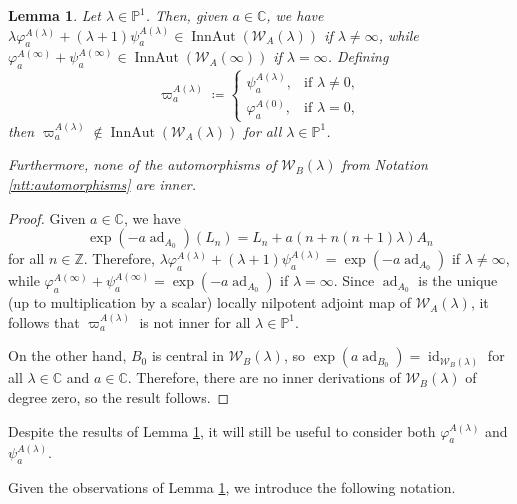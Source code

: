 \documentclass[11pt, svgnames]{amsart}
\DeclareMathOperator{\ad}{ad}
\newcommand{\ZZ}{\mathbb{Z}}
\newcommand{\CC}{\mathbb{C}}
\newcommand{\PP}{\mathbb{P}}
\newcommand{\W}{\mathcal{W}}
\DeclareMathOperator{\id}{id}
\DeclareMathOperator{\InnAut}{InnAut}
\newtheorem{lemma}[proposition]{Lemma}
\theoremstyle{definition}
\begin{document}
\begin{lemma}\label{lem:linear combination is inner}
    Let $\lambda \in \PP^1$. Then, given $a \in \CC$, we have $\lambda \varphi_a^{A(\lambda)} + (\lambda + 1)\psi_a^{A(\lambda)} \in \InnAut(\W_A(\lambda))$ if $\lambda \neq \infty$, while $\varphi_a^{A(\infty)} + \psi_a^{A(\infty)} \in \InnAut(\W_A(\infty))$ if $\lambda = \infty$. Defining
    \begin{equation}\label{eq:special automorphism A}
        \varpi_a^{A(\lambda)} \coloneqq \begin{cases}
            \psi_a^{A(\lambda)}, &\text{if } \lambda \neq 0, \\
            \varphi_a^{A(0)}, &\text{if } \lambda = 0,
        \end{cases}
    \end{equation}
    then $\varpi_a^{A(\lambda)} \notin \InnAut(\W_A(\lambda))$ for all $\lambda \in \PP^1$.

    Furthermore, none of the automorphisms of $\W_B(\lambda)$ from Notation \ref{ntt:automorphisms} are inner.
\end{lemma}
\begin{proof}
    Given $a \in \CC$, we have
    $$\exp(-a \ad_{A_0})(L_n) = L_n + a(n + n(n + 1)\lambda)A_n$$
    for all $n \in \ZZ$. Therefore, $\lambda \varphi_a^{A(\lambda)} + (\lambda + 1)\psi_a^{A(\lambda)} = \exp(-a \ad_{A_0})$ if $\lambda \neq \infty$, while $\varphi_a^{A(\infty)} + \psi_a^{A(\infty)} = \exp(-a \ad_{A_0})$ if $\lambda = \infty$. Since $\ad_{A_0}$ is the unique (up to multiplication by a scalar) locally nilpotent adjoint map of $\W_A(\lambda)$, it follows that $\varpi_a^{A(\lambda)}$ is not inner for all $\lambda \in \PP^1$.

    On the other hand, $B_0$ is central in $\W_B(\lambda)$, so $\exp(a \ad_{B_0}) = \id_{\W_B(\lambda)}$ for all $\lambda \in \CC$ and $a \in \CC$. Therefore, there are no inner derivations of $\W_B(\lambda)$ of degree zero, so the result follows.
\end{proof}

Despite the results of Lemma \ref{lem:linear combination is inner}, it will still be useful to consider both $\varphi_a^{A(\lambda)}$ and $\psi_a^{A(\lambda)}$.

Given the observations of Lemma \ref{lem:linear combination is inner}, we introduce the following notation.
\end{document}
